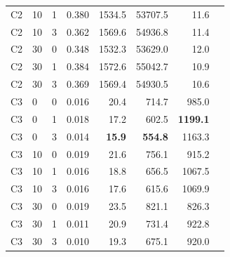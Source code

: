 \documentclass[pdflatex,sn-mathphys-num]{sn-jnl}%
\theoremstyle{thmstyleone}%
\theoremstyle{thmstyletwo}%
\theoremstyle{thmstylethree}%
\begin{document}
\begin{appendices}
\begin{table}
\begin{tabular}{llrrrrrr}
C2 & 10 & 1 & 0.380 & 1534.5 & 53707.5 & 11.6 \\
C2 & 10 & 3 & 0.362 & 1569.6 & 54936.8 & 11.4 \\
C2 & 30 & 0 & 0.348 & 1532.3 & 53629.0 & 12.0 \\
C2 & 30 & 1 & 0.384 & 1572.6 & 55042.7 & 10.9 \\
C2 & 30 & 3 & 0.369 & 1569.4 & 54930.5 & 10.6 \\
\addlinespace[4pt]
C3 & 0 & 0 & 0.016 & 20.4 & 714.7 & 985.0 \\
C3 & 0 & 1 & 0.018 & 17.2 & 602.5 & \textbf{1199.1} \\
C3 & 0 & 3 & 0.014 & \textbf{15.9} & \textbf{554.8} & 1163.3 \\
C3 & 10 & 0 & 0.019 & 21.6 & 756.1 & 915.2 \\
C3 & 10 & 1 & 0.016 & 18.8 & 656.5 & 1067.5 \\
C3 & 10 & 3 & 0.016 & 17.6 & 615.6 & 1069.9 \\
C3 & 30 & 0 & 0.019 & 23.5 & 821.1 & 826.3 \\
C3 & 30 & 1 & 0.011 & 20.9 & 731.4 & 922.8 \\
C3 & 30 & 3 & 0.010 & 19.3 & 675.1 & 920.0 \\
\bottomrule
\end{tabular}
\end{table}


\end{appendices}
\end{document}

